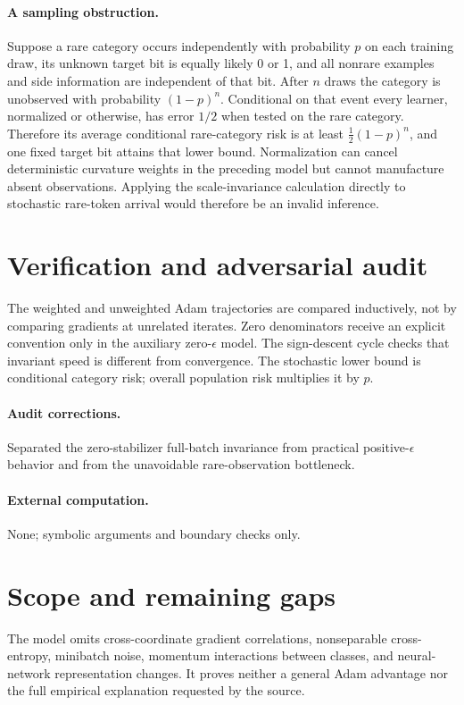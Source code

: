 \documentclass[11pt]{article}
\begin{document}
\paragraph{A sampling obstruction.}
Suppose a rare category occurs independently with probability $p$ on each training draw, its unknown target bit is equally likely 0 or 1, and all nonrare examples and side information are independent of that bit. After $n$ draws the category is unobserved with probability $(1-p)^n$. Conditional on that event every learner, normalized or otherwise, has error $1/2$ when tested on the rare category. Therefore its average conditional rare-category risk is at least $\tfrac12(1-p)^n$, and one fixed target bit attains that lower bound. Normalization can cancel deterministic curvature weights in the preceding model but cannot manufacture absent observations. Applying the scale-invariance calculation directly to stochastic rare-token arrival would therefore be an invalid inference.
\section{Verification and adversarial audit}
The weighted and unweighted Adam trajectories are compared inductively, not by comparing gradients at unrelated iterates. Zero denominators receive an explicit convention only in the auxiliary zero-$\epsilon$ model. The sign-descent cycle checks that invariant speed is different from convergence. The stochastic lower bound is conditional category risk; overall population risk multiplies it by $p$.
\paragraph{Audit corrections.} Separated the zero-stabilizer full-batch invariance from practical positive-$\epsilon$ behavior and from the unavoidable rare-observation bottleneck.
\paragraph{External computation.} None; symbolic arguments and boundary checks only.
\section{Scope and remaining gaps}
The model omits cross-coordinate gradient correlations, nonseparable cross-entropy, minibatch noise, momentum interactions between classes, and neural-network representation changes. It proves neither a general Adam advantage nor the full empirical explanation requested by the source.
\end{document}
